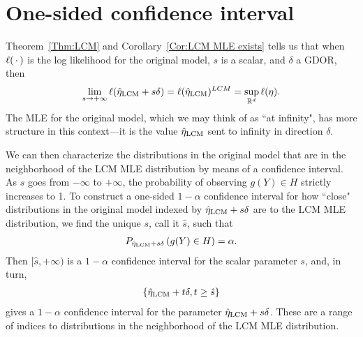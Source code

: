 \section{One-sided confidence interval} \label{S:CI}
Theorem~\ref{Thm:LCM} and Corollary~\ref{Cor:LCM MLE exists} 
tells us that when $\ell(\,\cdot\,)$ is the log likelihood for the original model,
$s$ is a scalar, and $\delta$ a GDOR, then
\begin{align*}
	\lim_{s \to +\infty} \ell(\hat{\eta}_{\textrm{LCM}} + s\delta) = \ell(\hat{\eta}_{\textrm{LCM}})^{LCM} = \sup_{{\mathbb R}^d} \ell(\eta).
\end{align*}
The MLE for the original model, which we may think of as ``at infinity", has
more structure in this context---it is the value $\hat{\eta}_{\textrm{LCM}}$ sent to 
infinity in direction $\delta$.

We can then characterize the distributions in the original model that are in the
neighborhood of the LCM MLE distribution by means of a confidence interval.
As $s$ goes from $-\infty$ to $+\infty$, the probability of observing 
$g(Y) \in H$ strictly increases to 1.  
To construct a one-sided $1-\alpha$ confidence interval for how ``close"
distributions in the original model indexed by $\hat{\eta}_{\textrm{LCM}} + s\delta$ 
are to the LCM MLE distribution, we find the unique $s$, call it $\hat{s}$, such that
\begin{align*}
	P_{\hat{\eta}_{\textrm{LCM}} + s\delta}\left (g(Y) \in H \right ) = \alpha.
\end{align*}
Then $[\hat{s}, +\infty)$ is a $1-\alpha$ confidence interval for the scalar parameter 
$s$, and, in turn, 
\begin{align*}
\left \{\hat{\eta}_{\textrm{LCM}} + t\delta, t \geq \hat{s} \right \}
\end{align*}
 gives a $1-\alpha$ confidence interval for the parameter $\hat{\eta}_{\textrm{LCM}} + s \delta$. 
These are a range of indices to distributions in the neighborhood of the LCM MLE
distribution.


